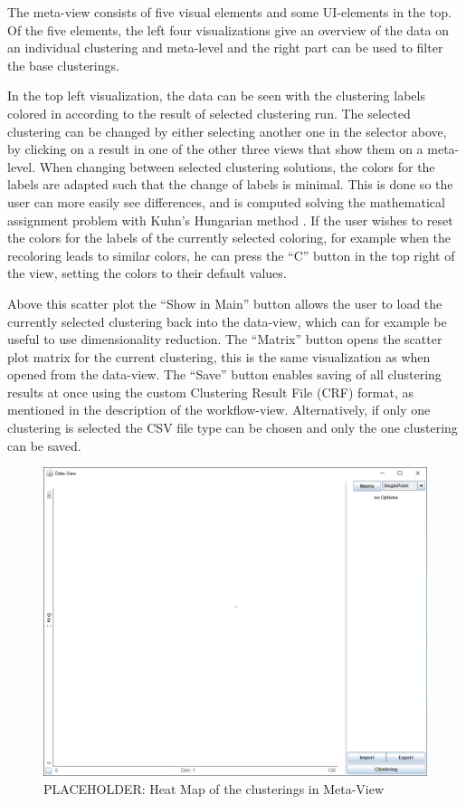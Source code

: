 \documentclass[
	a4paper,
	english,
	twoside,
	openright,               
	11pt                            
	]{report}
\begin{document}
The meta-view consists of five visual elements and some UI-elements in the top. Of the five elements, the left four visualizations give an overview of the data on an individual clustering and meta-level and the right part can be used to filter the base clusterings. 

In the top left visualization, the data can be seen with the clustering labels colored in according to the result of selected clustering run. The selected clustering can be changed by either selecting another one in the selector above, by clicking on a result in one of the other three views that  show them on a meta-level. When changing between selected clustering solutions, the colors for the labels are adapted such that the change of labels is minimal. This is done so the user can more easily see differences, and is computed solving the mathematical assignment problem with Kuhn’s Hungarian method \cite{Kuhn2010}. If the user wishes to reset the colors for the labels of the currently selected coloring, for example when the recoloring leads to similar colors, he can press the ``C'' button in the top right of the view, setting the colors to their default values.

Above this scatter plot the ``Show in Main'' button allows the user to load the currently selected clustering back into the data-view, which can for example be useful to use dimensionality reduction. The ``Matrix'' button opens the scatter plot matrix for the current clustering, this is the same visualization as when opened from the data-view. The ``Save'' button enables saving of all clustering results at once using the custom Clustering Result File (CRF) format, as mentioned in the description of the workflow-view. Alternatively, if only one clustering is selected the CSV file type can be chosen and only the one clustering can be saved.

\begin{figure}[h]
	\centering
	\includegraphics[scale=.45]{data-view}
	\caption{PLACEHOLDER: Heat Map of the clusterings in Meta-View}
	\label{fig:heatmap}
\end{figure}
\end{document}

